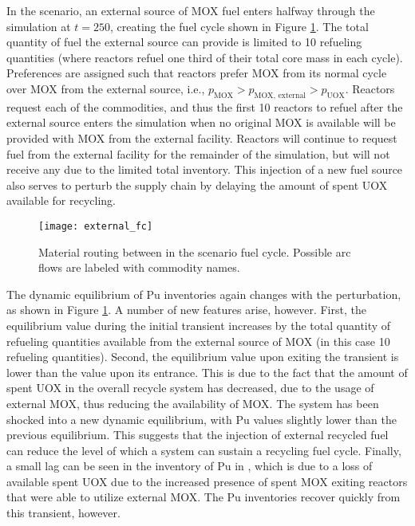 In the \external scenario, an external source of MOX fuel enters halfway
through the simulation at $t = 250$, creating the fuel cycle shown in Figure
\ref{fig:military}. The total quantity of fuel the external source can provide is
limited to 10 refueling quantities (where reactors refuel one third of their
total core mass in each cycle). Preferences are assigned such that reactors
prefer MOX from its normal cycle over MOX from the external source, i.e.,
$p_{\text{MOX}} > p_{\text{MOX, external}} > p_{\text{UOX}}$. Reactors request each
of the commodities, and thus the first 10 reactors to refuel after the external
source enters the simulation when no original MOX is available will be provided
with MOX from the external facility. Reactors will continue to request fuel from the
external facility for the remainder of the simulation, but will not receive any due
to the limited total inventory. This injection of a new fuel source also serves to
perturb the supply chain by delaying the amount of spent UOX available for
recycling.

\begin{figure}
  \begin{center}
    \texttt{[image: external\_fc]}
    \caption[]{
      \label{fig:military}
      Material routing between in the \external scenario fuel
      cycle. Possible arc flows are labeled with commodity names.}
  \end{center}
\end{figure}

The dynamic equilibrium of Pu inventories again changes with the \external
perturbation, as shown in Figure \ref{fig:military}. A number of new features
arise, however. First, the equilibrium value during the initial transient
increases by the total quantity of refueling quantities available from the
external source of MOX (in this case 10 refueling quantities). Second, the
equilibrium value upon exiting the transient is lower than the value upon its
entrance. This is due to the fact that the amount of spent UOX in the overall
recycle system has decreased, due to the usage of external MOX, thus reducing
the availability of MOX. The system has been shocked into a new dynamic
equilibrium, with Pu values slightly lower than the previous
equilibrium. This suggests that the injection of external recycled fuel can
reduce the level of which a system can sustain a recycling fuel cycle. Finally,
a small lag can be seen in the inventory of Pu in \fabrication, which is due
to a loss of available spent UOX due to the increased presence of spent MOX
exiting reactors that were able to utilize external MOX. The Pu inventories 
recover quickly from this transient, however.

